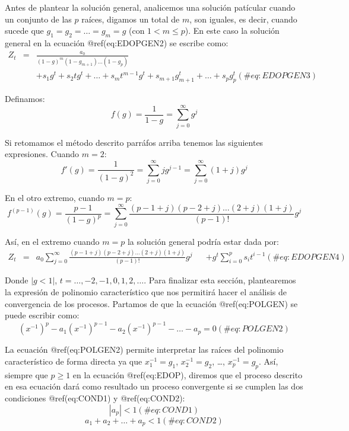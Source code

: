 \documentclass[
  a4paper,
]{article}
\begin{document}
Antes de plantear la solución general, analicemos una solución patícular
cuando un conjunto de las \(p\) raíces, digamos un total de \(m\), son
iguales, es decir, cuando sucede que \(g_1 = g_2 = \ldots = g_m = g\)
(con \(1 < m \leq p\)). En este caso la solución general en la ecuación
@ref(eq:EDOPGEN2) se escribe como: \begin{eqnarray}
    Z_t & = & \frac{a_0}{(1 - g)^m(1 - g_{m+1}) \ldots (1 - g_p)} \nonumber \\ 
    & & + s_1 g^t + s_2 t g^t + \ldots + s_m t^{m-1} g^t + s_{m+1} g^t_{m+1} + \ldots + s_{p} g^t_{p}
    (\#eq:EDOPGEN3)
\end{eqnarray}

Definamos: \[
    f(g) = \frac{1}{1 - g} = \sum_{j = 0}^{\infty} g^j
\]

Si retomamos el método descrito parráfos arriba tenemos las siguientes
expresiones. Cuando \(m = 2\): \[
    f'(g) = \frac{1}{(1 - g)^2} = \sum_{j = 0}^{\infty} j g^{j-1} = \sum_{j = 0}^{\infty} (1 + j) g^j \nonumber
\]

En el otro extremo, cuando \(m = p\): \[
    f^{(p-1)}(g) = \frac{p-1}{(1 - g)^p} = \sum_{j = 0}^{\infty} \frac{(p-1+j)(p-2+j) \ldots (2+j)(1+j)}{(p-1)!} g^j
\]

Así, en el extremo cuando \(m = p\) la solución general podría estar
dada por: \begin{eqnarray}
    Z_t & = & a_0 \sum_{j = 0}^{\infty} \frac{(p-1+j)(p-2+j) \ldots (2+j)(1+j)}{(p-1)!} g^j \nonumber 
    & & + g^t \sum_{i = 0}^p s_i t^{i-1}
    (\#eq:EDOPGEN4)
\end{eqnarray}

Donde \(|{g} < 1|\), \(t = \ldots, -2, -1, 0, 1, 2, \ldots\). Para
finalizar esta sección, plantearemos la expresión de polinomio
característico que nos permitirá hacer el análisis de convergencia de
los procesos. Partamos de que la ecuación @ref(eq:POLGEN) se puede
escribir como: \[
    (x^{-1})^p - a_1 (x^{-1})^{p-1} - a_2 (x^{-1})^{p-1} - \ldots - a_p = 0
    (\#eq:POLGEN2)
\]

La ecuación @ref(eq:POLGEN2) permite interpretar las raíces del
polinomio característico de forma directa ya que \(x^{-1}_1 = g_1\),
\(x^{-1}_2 = g_2\), \ldots, \(x^{-1}_p = g_p\). Así, siempre que
\(p \geq 1\) en la ecuación @ref(eq:EDOP), diremos que el proceso
descrito en esa ecuación dará como resultado un proceso convergente si
se cumplen las dos condiciones @ref(eq:COND1) y @ref(eq:COND2): \[
    |a_p| < 1  
    (\#eq:COND1)
\] \[
    a_1 + a_2 + \ldots + a_p < 1
    (\#eq:COND2)
\]
\end{document}

